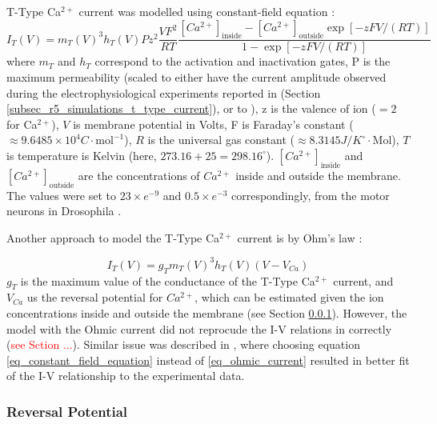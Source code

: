 \documentclass[../../workflow.tex]{subfiles}
\begin{document}
T-Type Ca$^{2+}$ current was modelled using constant-field equation \cite{huguenardSimulationCurrentsInvolved1992}:
\begin{equation}\label{eq_constant_field_equation}
    I_T(V) = m_T(V)^3 h_T(V) P z^2 \frac{VF^2}{RT}\frac{[Ca^{2+}]_{\text{inside}} - [Ca^{2+}]_{\text{outside}} \exp{[-zFV/(RT)]} }{1 - \exp{[-zFV/(RT)]}}
\end{equation}
where $m_T$ and $h_T$ correspond to the activation and inactivation gates,
P is the maximum permeability (scaled to either have the current amplitude observed
during the electrophysiological experiments reported in \cite{jeongCaa1TFlyTtype2015}
(Section \ref{subsec_r5_simulations_t_type_current}), or to ), z is the valence of ion ($=2$ for Ca$^{2+}$),
$V$ is membrane potential in Volts, F is Faraday's constant ($\approx 9.6485 \times 10^{4} C\cdot \text{mol}^{-1}$),
$R$ is the universal gas constant
($\approx 8.3145 J/K^\circ \cdot \text{Mol}$), $T$ is temperature is Kelvin (here, $273.16+25=298.16^{\circ}$).
$[Ca^{2+}]_{\text{inside}}$ and $[Ca^{2+}]_{\text{outside}}$ are the concentrations of $Ca^{2+}$ inside and
outside the membrane. The values were set to $23 \times e^{-9}$ and $0.5 \times e^{-3}$ correspondingly,
from the motor neurons in Drosophila
\cite{frankenhaeuserActionCalciumElectrical1957}.

Another approach to model the T-Type Ca$^{2+}$ current is by Ohm's law \cite{huguenardSimulationCurrentsInvolved1992, 
wangModelTtypeCalcium1991}:

\begin{equation}\label{eq_ohmic_current}
    I_T(V) = g_T m_T(V)^3 h_T(V) (V - V_{Ca})
\end{equation}
$g_T$ is the maximum value of the conductance of the T-Type
Ca$^{2+}$ current, and $V_{Ca}$ us the reversal potential for $Ca^{2+}$, which can be estimated
given the ion concentrations inside and outside the membrane (see Section \ref{subsbusec_reversal_potential}).
However, the model with the Ohmic current did not reprocude the I-V relations
in \cite{jeongCaa1TFlyTtype2015} correctly (\textcolor{red}{see Sction ...}).
Similar issue was described in \cite{huguenardSimulationCurrentsInvolved1992}, where choosing
equation \ref{eq_constant_field_equation} instead of \ref{eq_ohmic_current} resulted in better
fit of the I-V relationship to the experimental data.

\subsubsection{Reversal Potential}\label{subsbusec_reversal_potential}
\end{document}
